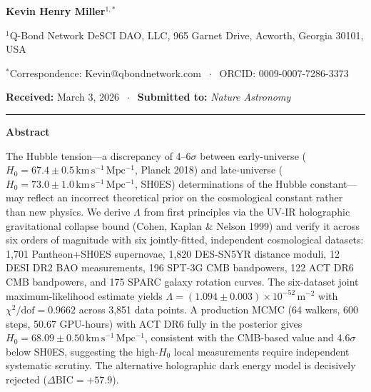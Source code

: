 \documentclass[12pt,a4paper]{article}
\newcommand{\kms}{\,\mathrm{km\,s^{-1}\,Mpc^{-1}}}
\begin{document}

\vspace{0.8cm}
\noindent
\textbf{Kevin Henry Miller}$^{1,*}$

\vspace{0.3cm}
\noindent
$^1$Q-Bond Network DeSCI DAO, LLC, 965 Garnet Drive, Acworth, Georgia 30101, USA

\vspace{0.2cm}
\noindent
$^*$Correspondence: Kevin@qbondnetwork.com $\;\cdot\;$ ORCID: 0009-0007-7286-3373

\vspace{0.5cm}
\noindent\textbf{Received:} March 3, 2026 $\;\cdot\;$ \textbf{Submitted to:} \textit{Nature Astronomy}

\vspace{0.8cm}
\noindent\rule{\linewidth}{0.5pt}


\begin{center}{\large\bfseries Abstract}\end{center}

\noindent
The Hubble tension---a discrepancy of 4--6$\sigma$ between early-universe
($H_0 = 67.4 \pm 0.5\kms$, Planck 2018) and late-universe
($H_0 = 73.0 \pm 1.0\kms$, SH0ES) determinations of the Hubble constant---
may reflect an incorrect theoretical prior on the cosmological constant rather
than new physics.
We derive $\Lambda$ from first principles via the UV-IR holographic gravitational
collapse bound (Cohen, Kaplan \& Nelson 1999) and verify it across six orders of
magnitude with six jointly-fitted, independent cosmological datasets: 1,701
Pantheon+SH0ES supernovae, 1,820 DES-SN5YR distance moduli, 12 DESI DR2 BAO
measurements, 196 SPT-3G CMB bandpowers, 122 ACT DR6 CMB bandpowers, and 175
SPARC galaxy rotation curves.
The six-dataset joint maximum-likelihood estimate yields
$\Lambda = (1.094 \pm 0.003)\times 10^{-52}\,\mathrm{m}^{-2}$
with $\chi^2/\mathrm{dof} = 0.9662$ across 3,851 data points.
A production MCMC (64 walkers, 600 steps, 50.67 GPU-hours)
with ACT DR6 fully in the posterior gives
$H_0 = 68.09 \pm 0.50\kms$, consistent with the CMB-based value and 4.6$\sigma$
below SH0ES, suggesting the high-$H_0$ local measurements require independent
systematic scrutiny.
The alternative holographic dark energy model is decisively rejected
($\Delta\mathrm{BIC} = +57.9$).
\end{document}
